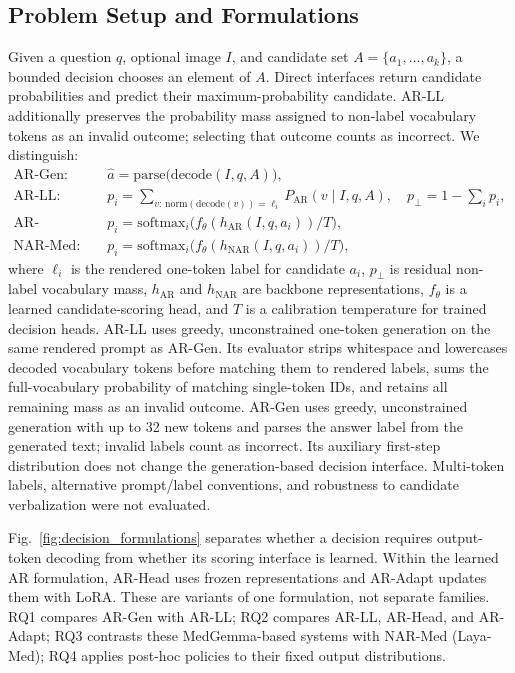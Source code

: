 \subsection{Problem Setup and Formulations}
Given a question $q$, optional image $I$, and candidate set $A=\{a_1,\ldots,a_k\}$, a bounded decision chooses an element of $A$. Direct interfaces return candidate probabilities and predict their maximum-probability candidate. AR-LL additionally preserves the probability mass assigned to non-label vocabulary tokens as an invalid outcome; selecting that outcome counts as incorrect. We distinguish:
\begin{align}
\text{AR-Gen:}\quad &\hat{a}=\mathrm{parse}\big(\mathrm{decode}(I,q,A)\big),\\
\text{AR-LL:}\quad &p_i=\sum_{v:\,\mathrm{norm}(\mathrm{decode}(v))=\ell_i}P_{\mathrm{AR}}(v\mid I,q,A),\quad p_{\bot}=1-\sum_i p_i,\\
\text{AR-Head/AR-Adapt:}\quad &p_i=\mathrm{softmax}_i\big(f_\theta(h_{\mathrm{AR}}(I,q,a_i))/T\big),\\
\text{NAR-Med:}\quad &p_i=\mathrm{softmax}_i\big(f_\theta(h_{\mathrm{NAR}}(I,q,a_i))/T\big),
\end{align}
where $\ell_i$ is the rendered one-token label for candidate $a_i$, $p_{\bot}$ is residual non-label vocabulary mass, $h_{\mathrm{AR}}$ and $h_{\mathrm{NAR}}$ are backbone representations, $f_\theta$ is a learned candidate-scoring head, and $T$ is a calibration temperature for trained decision heads. AR-LL uses greedy, unconstrained one-token generation on the same rendered prompt as AR-Gen. Its evaluator strips whitespace and lowercases decoded vocabulary tokens before matching them to rendered labels, sums the full-vocabulary probability of matching single-token IDs, and retains all remaining mass as an invalid outcome. AR-Gen uses greedy, unconstrained generation with up to 32 new tokens and parses the answer label from the generated text; invalid labels count as incorrect. Its auxiliary first-step distribution does not change the generation-based decision interface. Multi-token labels, alternative prompt/label conventions, and robustness to candidate verbalization were not evaluated.

Fig.~\ref{fig:decision_formulations} separates whether a decision requires output-token decoding from whether its scoring interface is learned. Within the learned AR formulation, AR-Head uses frozen representations and AR-Adapt updates them with LoRA. These are variants of one formulation, not separate families. RQ1 compares AR-Gen with AR-LL; RQ2 compares AR-LL, AR-Head, and AR-Adapt; RQ3 contrasts these MedGemma-based systems with NAR-Med (Laya-Med); RQ4 applies post-hoc policies to their fixed output distributions.


